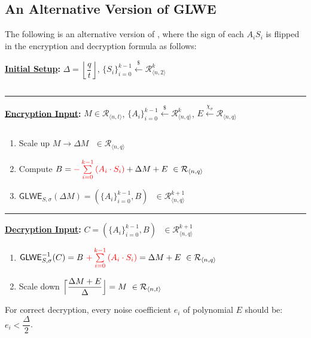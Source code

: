 \subsection{An Alternative Version of GLWE}
\label{subsec:glwe-alternative}

The following is an alternative version of \tboxlabel{\ref*{subsec:glwe-enc}}, where the sign of each $A_iS_i$ is flipped in the encryption and decryption formula as follows: 

\begin{tcolorbox}[title={\textbf{\tboxlabel{\ref*{subsec:glwe-alternative}} An Alternative GLWE Cryptosystem}}]

\textbf{\underline{Initial Setup}:} $\Delta = \left\lfloor\dfrac{q}{t}\right\rfloor$, $\{S_i\}_{i=0}^{k-1} \xleftarrow{\$} \mathcal{R}_{\langle n, 2 \rangle}^k$

$ $

\par\noindent\rule{\textwidth}{0.4pt}


\textbf{\underline{Encryption Input}:} $M \in \mathcal{R}_{\langle n, t \rangle}$, $\{A_i\}_{i=0}^{k-1} \xleftarrow{\$} \mathcal{R}_{\langle n,q \rangle}^{k}$, $E \xleftarrow{\chi_\sigma} \mathcal{R}_{\langle n,q \rangle}$

$ $

\begin{enumerate}
\item Scale up $M \longrightarrow \Delta M \text { } \in \mathcal{R}_{\langle n, q\rangle}$

\item Compute $B = \textcolor{red}{-\sum\limits_{i=0}^{k-1}{(A_i \cdot S_i)}} + \Delta  M + E \text{ } \in \mathcal{R}_{\langle n,q \rangle}$

\item $\textsf{GLWE}_{S,\sigma}(\Delta M) = (\{A_i\}_{i=0}^{k-1}, B) \text{ } \in \mathcal{R}_{\langle n,q \rangle}^{k + 1}$ 

\end{enumerate}

\par\noindent\rule{\textwidth}{0.4pt}


\textbf{\underline{Decryption Input}:} $C = (\{A_i\}_{i=0}^{k-1}, B) \text{ } \in \mathcal{R}_{\langle n,q \rangle}^{k + 1}$

\begin{enumerate}
\item $\textsf{GLWE}^{-1}_{S,\sigma}(C) = B \text{ } \textcolor{red}{ + \sum\limits_{i=0}^{k-1}{(A_i \cdot S_i)}} = \Delta  M + E \text{ } \in \mathcal{R}_{\langle n,q \rangle}$

\item Scale down 
$\Bigl\lceil \dfrac{ \Delta  M + E }{\Delta}\Bigr\rfloor = M  \text{ } \in \mathcal{R}_{\langle n, t \rangle}$

\end{enumerate}

For correct decryption, every noise coefficient $e_i$ of polynomial $E$ should be: $e_i < \dfrac{\Delta}{2}$.

\end{tcolorbox}

